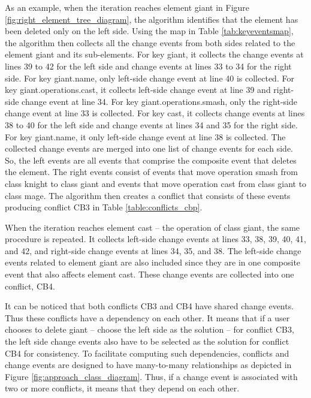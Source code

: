 As an example, when the iteration reaches element \textsf{giant} in Figure \ref{fig:right_element_tree_diagram}, the algorithm identifies that the element has been deleted only on the left side.
Using the map in Table \ref{tab:keyeventsmap}, the algorithm then collects all the change events from both sides related to the element \textsf{giant} and its sub-elements. For key \textsf{giant}, it collects the change events at lines 39 to 42 for the left side and change events at lines 33 to 34 for the right side. For key \textsf{giant.name}, only left-side change event at line 40 is collected.
For key \textsf{giant.operations.cast}, it collects left-side change event at line 39 and right-side change event at line 34.
For key \textsf{giant.operations.smash}, only the right-side change event at line 33 is collected. 
For key \textsf{cast}, it collects change events at lines 38 to 40 for the left side and change events at lines 34 and 35 for the right side.
For key \textsf{giant.name}, it only left-side change event at line 38 is collected.
The collected change events are merged into one list of change events for each side. 
So, the left events are all events that comprise the composite event that deletes the element. 
The right events consist of events that move operation \textsf{smash} from class \textsf{knight} to class \textsf{giant} and events that
move operation \textsf{cast} from class \textsf{giant} to class \textsf{mage}. The algorithm then creates a conflict that consists of these events 
producing conflict \textsf{CB3} in Table \ref{table:conflicts_cbp}. 

When the iteration reaches element \textsf{cast} -- the operation of class \textsf{giant}, the same procedure is repeated. It collects left-side change events at lines 33, 38, 39, 40, 41, and 42, and right-side change events at lines 34, 35, and 38. The left-side change events related to element \textsf{giant} are also included since they are in one composite event that also affects element \textsf{cast}. These change events are collected into one conflict, \textsf{CB4}. 

It can be noticed that both conflicts \textsf{CB3} and \textsf{CB4} have shared change events. Thus these conflicts have a dependency on each other. It means that if a user chooses to delete \textsf{giant} -- choose the left side as the solution -- for conflict \textsf{CB3}, the left side change events also have to be selected as the solution for conflict \textsf{CB4} for consistency. To facilitate computing such dependencies, conflicts and change events are designed to have many-to-many relationships as depicted in Figure \ref{fig:approach_class_diagram}. Thus, if a change event is associated with two or more conflicts, it means that they depend on each other.

